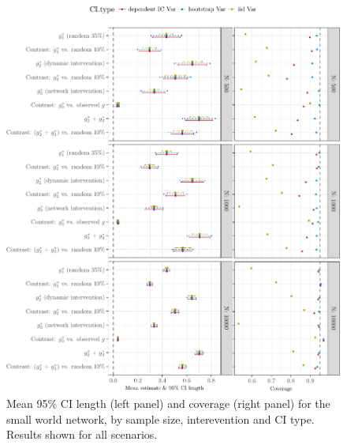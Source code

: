 \documentclass[english]{article}\usepackage[]{graphicx}\usepackage[]{color}
\makeatletter
\def\maxwidth{ %
  \ifdim\Gin@nat@width>\linewidth
    \linewidth
  \else
    \Gin@nat@width
  \fi
}
\newenvironment{knitrout}{}{} %
\theoremstyle{plain}
\theoremstyle{plain}
\makeatother
\begin{document}
\begin{knitrout}\footnotesize
{}\color{fgcolor}\begin{figure}

{\centering \includegraphics[width=\maxwidth]{TablesFigs/knitR-CIres_ALL_smwld-1} 

}

\caption[Mean 95\% CI length (left panel) and coverage (right panel) for the small world network, by sample size, interevention and CI type]{Mean 95\% CI length (left panel) and coverage (right panel) for the small world network, by sample size, interevention and CI type. Results shown for all scenarios.}\label{fig:CIres.ALL.smwld}
\end{figure}


\end{knitrout}
\end{document}
